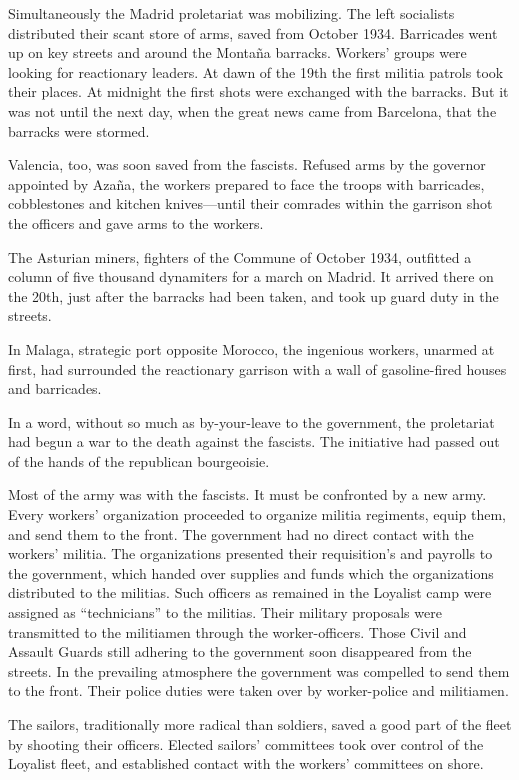 Simultaneously the Madrid proletariat was mobilizing. The left socialists distributed their scant store of arms, saved from October 1934. Barricades went up on key streets and around the Montaña barracks. Workers’ groups were looking for reactionary leaders. At dawn of the 19th the first militia patrols took their places. At midnight the first shots were exchanged with the barracks. But it was not until the next day, when the great news came from Barcelona, that the barracks were stormed.

Valencia, too, was soon saved from the fascists. Refused arms by the governor appointed by Azaña, the workers prepared to face the troops with barricades, cobblestones and kitchen knives---until their comrades within the garrison shot the officers and gave arms to the workers.

The Asturian miners, fighters of the Commune of October 1934, outfitted a column of five thousand dynamiters for a march on Madrid. It arrived there on the 20th, just after the barracks had been taken, and took up guard duty in the streets.
\nowidow

In Malaga, strategic port opposite Morocco, the ingenious workers, unarmed at first, had surrounded the reactionary garrison with a wall of gasoline-fired houses and barricades.

In a word, without so much as by-your-leave to the government, the proletariat had begun a war to the death against the fascists. The initiative had passed out of the hands of the republican bourgeoisie.

Most of the army was with the fascists. It must be confronted by a new army. Every workers’ organization proceeded to organize militia regiments, equip them, and send them to the front. The government had no direct contact with the workers’ militia. The organizations presented their requisition’s and payrolls to the government, which handed over supplies and funds which the organizations distributed to the militias. Such officers as remained in the Loyalist camp were assigned as ``technicians'' to the militias. Their military proposals were transmitted to the militiamen through the worker-officers. Those Civil and Assault Guards still adhering to the government soon disappeared from the streets. In the prevailing atmosphere the government was compelled to send them to the front. Their police duties were taken over by worker-police and militiamen.

The sailors, traditionally more radical than soldiers, saved a good part of the fleet by shooting their officers. Elected sailors’ committees took over control of the Loyalist fleet, and established contact with the workers’ committees on shore.

